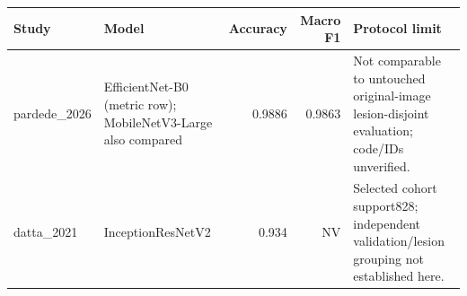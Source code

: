 \begin{tabularx}{\linewidth}{lXrrX}
\hline
Study & Model & Accuracy & Macro F1 & Protocol limit \\
\hline
pardede\_2026 & EfficientNet-B0 (metric row); MobileNetV3-Large also compared & 0.9886 & 0.9863 & Not comparable to untouched original-image lesion-disjoint evaluation; code/IDs unverified. \\
datta\_2021 & InceptionResNetV2 & 0.934 & NV & Selected cohort support828; independent validation/lesion grouping not established here. \\
\hline
\end{tabularx}
